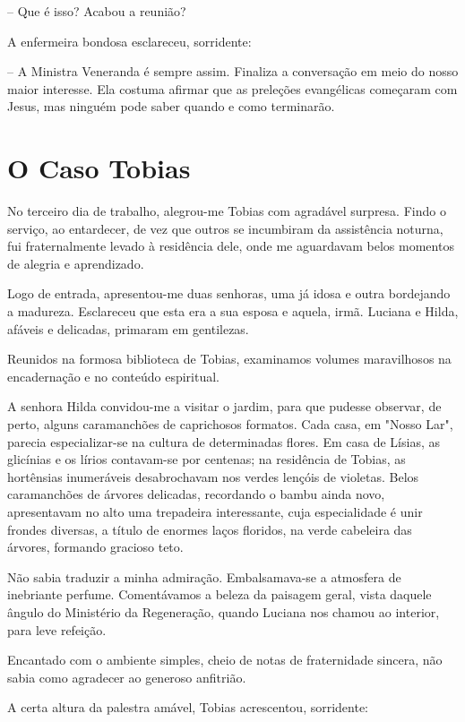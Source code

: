 \documentclass[portuguese,12pt,a4paper]{scrbook}
\begin{document}
	– Que é isso? Acabou a reunião?
	
	A enfermeira bondosa esclareceu, sorridente:
	
	– A Ministra Veneranda é sempre assim. Finaliza a conversação em meio do nosso maior interesse. Ela costuma afirmar que as preleções evangélicas começaram com Jesus, mas ninguém pode saber quando e como terminarão.
	
	
	\chapter{O Caso Tobias}
	
	No terceiro dia de trabalho, alegrou-me Tobias com agradável surpresa. Findo o serviço, ao entardecer, de vez que outros se incumbiram da assistência noturna, fui fraternalmente levado à residência dele, onde me aguardavam belos momentos de alegria e aprendizado.
	
	Logo de entrada, apresentou-me duas senhoras, uma já idosa e outra bordejando a madureza. Esclareceu que esta era a sua esposa e aquela, irmã. Luciana e Hilda, afáveis e delicadas, primaram em gentilezas.
	
	Reunidos na formosa biblioteca de Tobias, examinamos volumes maravilhosos na encadernação e no conteúdo espiritual.
	
	A senhora Hilda convidou-me a visitar o jardim, para que pudesse observar, de perto, alguns caramanchões de caprichosos formatos. Cada casa, em "Nosso Lar", parecia especializar-se na cultura de determinadas flores. Em casa de Lísias, as glicínias e os lírios contavam-se por centenas; na residência de Tobias, as hortênsias inumeráveis desabrochavam nos verdes lençóis de violetas. Belos caramanchões de árvores delicadas, recordando o bambu ainda novo, apresentavam no alto uma trepadeira interessante, cuja especialidade é unir frondes diversas, a título de enormes laços floridos, na verde cabeleira das árvores, formando gracioso teto.
	
	Não sabia traduzir a minha admiração. Embalsamava-se a atmosfera de inebriante perfume. Comentávamos a beleza da paisagem geral, vista daquele ângulo do Ministério da Regeneração, quando Luciana nos chamou ao interior, para leve refeição.
	
	
	Encantado com o ambiente simples, cheio de notas de fraternidade sincera, não sabia como agradecer ao generoso anfitrião.
	
	A certa altura da palestra amável, Tobias acrescentou, sorridente:
	
\end{document}
